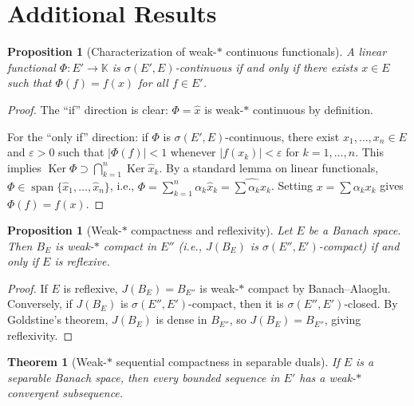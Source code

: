 \documentclass[a4paper,12pt]{book}
\DeclareMathOperator{\Ker}{Ker}
\DeclareMathOperator{\spn}{span}
\newcommand{\K}{\mathbb{K}}
\theoremstyle{definition}
\theoremstyle{plain}
\newtheorem{theorem}[definition]{Theorem}
\newtheorem{proposition}[definition]{Proposition}
\theoremstyle{remark}
\begin{document}
\section{Additional Results}\label{sec:weak-additional}

\begin{proposition}[Characterization of weak-$*$ continuous functionals]%
\label{prop:weak-star-continuous}
A linear functional $\Phi:E'\to\K$ is $\sigma(E',E)$-continuous if and only if
there exists $x\in E$ such that $\Phi(f)=f(x)$ for all $f\in E'$.
\end{proposition}

\begin{proof}
The ``if'' direction is clear: $\Phi = \hat{x}$ is weak-$*$ continuous
by definition.

For the ``only if'' direction: if $\Phi$ is $\sigma(E',E)$-continuous, there
exist $x_1,\ldots,x_n\in E$ and $\varepsilon>0$ such that
$|\Phi(f)|<1$ whenever $|f(x_k)|<\varepsilon$ for $k=1,\ldots,n$.
This implies $\Ker\Phi\supset\bigcap_{k=1}^n\Ker\hat{x}_k$.  By a standard
lemma on linear functionals,
$\Phi\in\spn\{\hat{x}_1,\ldots,\hat{x}_n\}$, i.e.,
$\Phi = \sum_{k=1}^n\alpha_k\hat{x}_k = \widehat{\sum\alpha_k x_k}$.
Setting $x=\sum\alpha_k x_k$ gives $\Phi(f)=f(x)$.
\end{proof}

\begin{proposition}[Weak-$*$ compactness and reflexivity]\label{prop:wstar-compact-reflexive}
Let $E$ be a Banach space.  Then $B_E$ is weak-$*$ compact in $E''$
(i.e., $J(B_E)$ is $\sigma(E'',E')$-compact) if and only if $E$ is reflexive.
\end{proposition}

\begin{proof}
If $E$ is reflexive, $J(B_E) = B_{E''}$ is weak-$*$ compact by Banach--Alaoglu.
Conversely, if $J(B_E)$ is $\sigma(E'',E')$-compact, then it is
$\sigma(E'',E')$-closed.  By Goldstine's theorem, $J(B_E)$ is dense in
$B_{E''}$, so $J(B_E)=B_{E''}$, giving reflexivity.
\end{proof}

\begin{theorem}[Weak-$*$ sequential compactness in separable duals]%
\label{thm:wstar-sep-sequential}
If $E$ is a separable Banach space, then every bounded sequence in $E'$ has
a weak-$*$ convergent subsequence.
\end{theorem}
\end{document}
